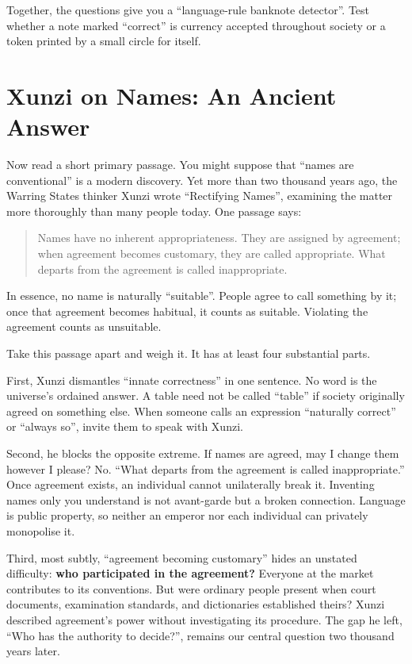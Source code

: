 Together, the questions give you a ``language-rule banknote detector''. Test whether a note marked ``correct'' is currency accepted throughout society or a token printed by a small circle for itself.

\section{Xunzi on Names: An Ancient Answer}
Now read a short primary passage. You might suppose that ``names are conventional'' is a modern discovery. Yet more than two thousand years ago, the Warring States thinker Xunzi wrote ``Rectifying Names'', examining the matter more thoroughly than many people today. One passage says:

\begin{quote}
Names have no inherent appropriateness. They are assigned by agreement; when agreement becomes customary, they are called appropriate. What departs from the agreement is called inappropriate.
\end{quote}
In essence, no name is naturally ``suitable''. People agree to call something by it; once that agreement becomes habitual, it counts as suitable. Violating the agreement counts as unsuitable.

Take this passage apart and weigh it. It has at least four substantial parts.

First, Xunzi dismantles ``innate correctness'' in one sentence. No word is the universe's ordained answer. A table need not be called ``table'' if society originally agreed on something else. When someone calls an expression ``naturally correct'' or ``always so'', invite them to speak with Xunzi.

Second, he blocks the opposite extreme. If names are agreed, may I change them however I please? No. ``What departs from the agreement is called inappropriate.'' Once agreement exists, an individual cannot unilaterally break it. Inventing names only you understand is not avant-garde but a broken connection. Language is public property, so neither an emperor nor each individual can privately monopolise it.

Third, most subtly, ``agreement becoming customary'' hides an unstated difficulty: \textbf{who participated in the agreement?} Everyone at the market contributes to its conventions. But were ordinary people present when court documents, examination standards, and dictionaries established theirs? Xunzi described agreement's power without investigating its procedure. The gap he left, ``Who has the authority to decide?'', remains our central question two thousand years later.

